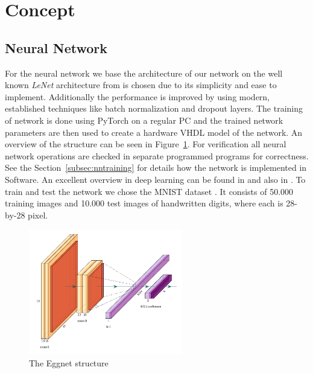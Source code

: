 \section{Concept}

\subsection{Neural Network}

For the neural network we base the architecture of our network on the well known \emph{LeNet} architecture from \cite{LeCun:1998aa} is chosen due to its simplicity and ease to implement. Additionally the performance is improved by using modern, established techniques like batch normalization \cite{Ioffe:2015aa} and dropout \cite{Srivastava:2014aa} layers. 
The training of network is done using PyTorch \cite{Paszke:2019aa} on a regular PC and the trained network parameters are then used to create a hardware VHDL model of the network. An overview of the structure can be seen in Figure~\ref{fig:eggnet}. For verification all neural network operations are checked in separate programmed programs for correctness. See the Section~\ref{subsec:nntraining} for details how the network is implemented in Software.
An excellent overview in deep learning can be found in \cite{Schmidhuber:2015aa} and also in \cite{Goodfellow:2016aa}.
To train and test the network we chose the MNIST dataset \cite{LeCun:1998ab}. It consists of 50.000 training images and 10.000 test images of handwritten digits, where each is 28-by-28 pixel.

\begin{figure}[hbt]
	\centering
	\includegraphics[width=0.6\textwidth]{img/eggnet}
	\caption{The Eggnet structure}
	\label{fig:eggnet}
\end{figure}


